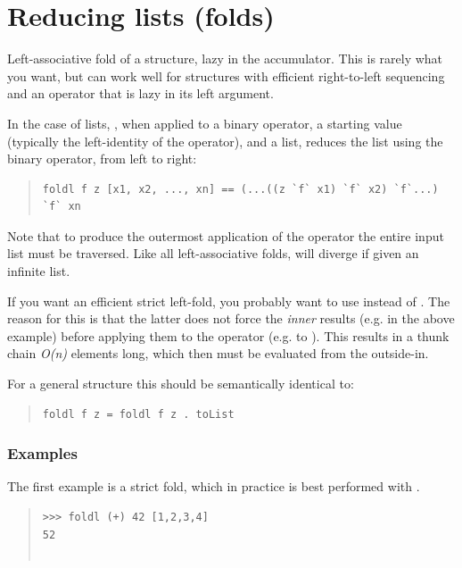 \section{Reducing lists (folds)}
\begin{haddockdesc}
\item[\begin{tabular}{@{}l}
foldl :: Foldable t => (b -> a -> b) -> b -> t a -> b
\end{tabular}]
{\haddockbegindoc
Left-associative fold of a structure, lazy in the accumulator.  This
 is rarely what you want, but can work well for structures with efficient
 right-to-left sequencing and an operator that is lazy in its left
 argument.\par
In the case of lists, , when applied to a binary operator, a
 starting value (typically the left-identity of the operator), and a
 list, reduces the list using the binary operator, from left to right:\par
\begin{quote}
{\haddockverb\begin{verbatim}
foldl f z [x1, x2, ..., xn] == (...((z `f` x1) `f` x2) `f`...) `f` xn\end{verbatim}}
\end{quote}
Note that to produce the outermost application of the operator the
 entire input list must be traversed.  Like all left-associative folds,
  will diverge if given an infinite list.\par
If you want an efficient strict left-fold, you probably want to use
  instead of .  The reason for this is that the latter
 does not force the \emph{inner} results (e.g.  in the above
 example) before applying them to the operator (e.g. to ).
 This results in a thunk chain \emph{O(n)} elements long, which then must be
 evaluated from the outside-in.\par
For a general  structure this should be semantically identical
 to:\par
\begin{quote}
{\haddockverb\begin{verbatim}
foldl f z = foldl f z . toList\end{verbatim}}
\end{quote}
\subsubsection*{\textbf{Examples}}
The first example is a strict fold, which in practice is best performed
 with .\par
\begin{quote}
{\haddockverb\begin{verbatim}
>>> foldl (+) 42 [1,2,3,4]
52


\end{verbatim}}
\end{quote}}
\end{haddockdesc}
